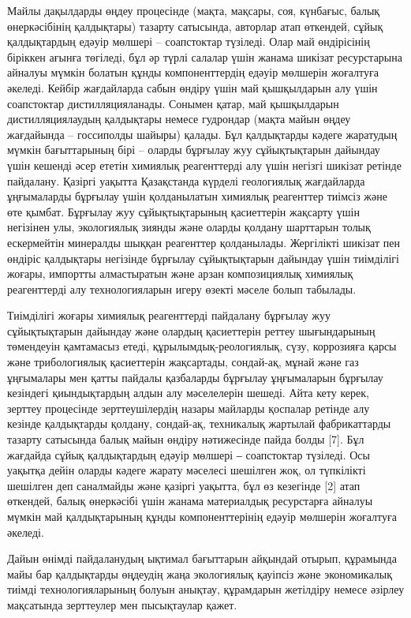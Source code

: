 \begin{multicols}{2}
Майлы дақылдарды өңдеу процесінде (мақта, мақсары, соя, күнбағыс, балық
өнеркәсібінің қалдықтары) тазарту сатысында, авторлар атап өткендей,
сұйық қалдықтардың едәуір мөлшері -- соапстоктар түзіледі. Олар май
өндірісінің біріккен ағынға төгіледі, бұл әр түрлі салалар үшін жанама
шикізат ресурстарына айналуы мүмкін болатын құнды компоненттердің едәуір
мөлшерін жоғалтуға әкеледі. Кейбір жағдайларда сабын өндіру үшін май
қышқылдарын алу үшін соапстоктар дистилляцияланады. Сонымен қатар, май
қышқылдарын дистилляциялаудың қалдықтары немесе гудрондар (мақта майын
өңдеу жағдайында -- госсиполды шайыры) қалады. Бұл қалдықтарды кәдеге
жаратудың мүмкін бағыттарының бірі -- оларды бұрғылау жуу сұйықтықтарын
дайындау үшін кешенді әсер ететін химиялық реагенттерді алу үшін негізгі
шикізат ретінде пайдалану. Қазіргі уақытта Қазақстанда күрделі
геологиялық жағдайларда ұңғымаларды бұрғылау үшін қолданылатын химиялық
реагенттер тиімсіз және өте қымбат. Бұрғылау жуу сұйықтықтарының
қасиеттерін жақсарту үшін негізінен улы, экологиялық зиянды және оларды
қолдану шарттарын толық ескермейтін минералды шыққан реагенттер
қолданылады. Жергілікті шикізат пен өндіріс қалдықтары негізінде
бұрғылау сұйықтықтарын дайындау үшін тиімділігі жоғары, импортты
алмастыратын және арзан композициялық химиялық реагенттерді алу
технологияларын игеру өзекті мәселе болып табылады.

Тиімділігі жоғары химиялық реагенттерді пайдалану бұрғылау жуу
сұйықтықтарын дайындау және олардың қасиеттерін реттеу шығындарының
төмендеуін қамтамасыз етеді, құрылымдық-реологиялық, сүзу, коррозияға
қарсы және трибологиялық қасиеттерін жақсартады, сондай-ақ, мұнай және
газ ұңғымалары мен қатты пайдалы қазбаларды бұрғылау ұңғымаларын
бұрғылау кезіндегі қиындықтардың алдын алу мәселелерін шешеді. Айта кету
керек, зерттеу процесінде зерттеушілердің назары майларды қоспалар
ретінде алу кезінде қалдықтарды қолдану, сондай-ақ, техникалық жартылай
фабрикаттарды тазарту сатысында балық майын өндіру нәтижесінде пайда
болды {[}7{]}. Бұл жағдайда сұйық қалдықтардың едәуір мөлшері ‒
соапстоктар түзіледі. Осы уақытқа дейін оларды кәдеге жарату мәселесі
шешілген жоқ, ол түпкілікті шешілген деп саналмайды және қазіргі
уақытта, бұл өз кезегінде {[}2{]} атап өткендей, балық өнеркәсібі үшін
жанама материалдық ресурстарға айналуы мүмкін май қалдықтарының құнды
компоненттерінің едәуір мөлшерін жоғалтуға әкеледі.

Дайын өнімді пайдаланудың ықтимал бағыттарын айқындай отырып, құрамында
майы бар қалдықтарды өңдеудің жаңа экологиялық қауіпсіз және
экономикалық тиімді технологияларының болуын анықтау, құрамдарын
жетілдіру немесе әзірлеу мақсатында зерттеулер мен пысықтаулар қажет.


\end{multicols}

